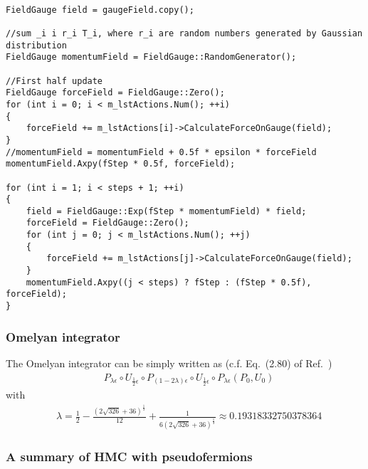 \begin{lstlisting}

FieldGauge field = gaugeField.copy();

//sum _i i r_i T_i, where r_i are random numbers generated by Gaussian distribution
FieldGauge momentumField = FieldGauge::RandomGenerator();

//First half update
FieldGauge forceField = FieldGauge::Zero();
for (int i = 0; i < m_lstActions.Num(); ++i)
{
    forceField += m_lstActions[i]->CalculateForceOnGauge(field);
}
//momentumField = momentumField + 0.5f * epsilon * forceField
momentumField.Axpy(fStep * 0.5f, forceField);

for (int i = 1; i < steps + 1; ++i)
{
    field = FieldGauge::Exp(fStep * momentumField) * field;
    forceField = FieldGauge::Zero();
    for (int j = 0; j < m_lstActions.Num(); ++j)
    {
        forceField += m_lstActions[j]->CalculateForceOnGauge(field);
    }
    momentumField.Axpy((j < steps) ? fStep : (fStep * 0.5f), forceField);
}

\end{lstlisting}

\subsubsection{\label{Omelyan}Omelyan integrator}

The Omelyan integrator can be simply written as (c.f. Eq.~(2.80) of Ref.~\cite{latticeqcdbook2017})
\begin{equation}
\begin{split}
&P_{\lambda\epsilon}\circ U_{\frac{1}{2}\epsilon}\circ P_{(1-2\lambda)\epsilon}\circ U_{\frac{1}{2}\epsilon}\circ P_{\lambda\epsilon}\left(P_0,U_0\right)
\end{split}
\label{eq.hmc.update_Omelyan}
\end{equation}
with
\begin{equation}
\begin{split}
&\lambda = \frac{1}{2}-\frac{\left(2\sqrt{326}+36\right)^{\frac{1}{3}}}{12}+\frac{1}{6\left(2\sqrt{326}+36\right)^{\frac{1}{3}}}\approx 0.19318332750378364
\end{split}
\label{eq.hmc.update_Omelyan2}
\end{equation}

\subsubsection{\label{summaryOfHMC}A summary of HMC with pseudofermions}

